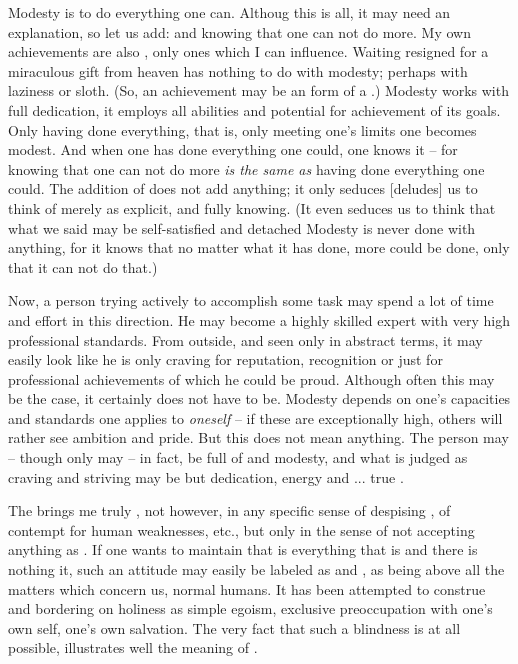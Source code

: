 \subpa Modesty is to do everything one can. Althoug this is all, it may need an
explanation, so let us add: and knowing that one can not do more.  My own
achievements are also , only ones which I can influence. Waiting
resigned for a miraculous gift from heaven has nothing to do with modesty;
perhaps with laziness or sloth. (So, an achievement may be an  form
of a .)  Modesty works with full dedication, it employs all abilities
and potential for achievement of its goals. Only having done everything, that
is, only meeting one's limits one becomes modest. And when one has done
everything one could, one knows it -- for knowing that one can not do more {\em
  is the same as} having done everything one could. The addition of   does not add anything; it only seduces [deludes] us to think of
 merely as explicit,  and fully  knowing.
(It even seduces us to think that what we said may be self-satisfied and detached
 Modesty is never done
with anything, for it knows that no matter what it has done, more could be done,
only that it can not do that.)

Now, a person trying actively to accomplish some task may spend a lot of time
and effort in this direction.  He may become a highly skilled expert with very
high professional standards.  From outside, and seen only in abstract terms, it
may easily look like he is only craving for reputation, recognition or just for
professional achievements of which he could be proud. Although often this may be
the case, it certainly does not have to be. Modesty depends on one's capacities and standards one applies to
{\em oneself} -- if these are exceptionally high, others will rather see
ambition and pride.  But this does not mean anything.  The person may -- though
only may -- in fact, be full of  and modesty, and what is judged as
craving and striving may be but dedication, energy and ... true .

\subpa
The  brings me truly , not however, in
any specific sense of despising , of contempt for human
weaknesses, etc., but only in the sense of not accepting anything 
as .  If one wants to maintain that  is everything
that is and there is nothing  it, such an attitude may easily be
labeled as  and , as being above all the matters which
concern us, normal humans. It has been attempted to construe  and
 bordering on holiness as simple egoism, exclusive preoccupation
with one's own self, one's own salvation. The very fact that such a blindness is
at all possible, illustrates well the meaning of . 

